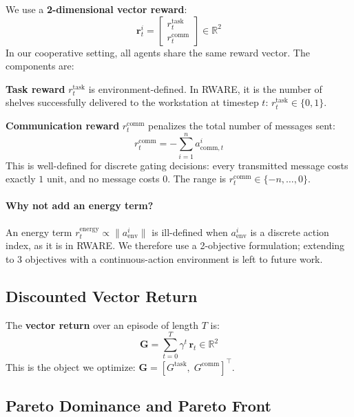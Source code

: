 \documentclass[runningheads]{llncs}
\newcommand{\R}{\mathbb{R}}
\newcommand{\bG}{\mathbf{G}}
\newcommand{\br}{\mathbf{r}}
\begin{document}
We use a \textbf{2-dimensional vector reward}:
\begin{equation}
  \br^i_t =
  \begin{bmatrix} r^{\text{task}}_t \\ r^{\text{comm}}_t \end{bmatrix}
  \in \R^2
  \label{eq:reward_vector}
\end{equation}
In our cooperative setting, all agents share the same reward vector.
The components are:

\textbf{Task reward} $r^{\text{task}}_t$ is environment-defined.
In RWARE, it is the number of shelves successfully delivered to the
workstation at timestep $t$: $r^{\text{task}}_t \in \{0, 1\}$.

\textbf{Communication reward} $r^{\text{comm}}_t$ penalizes the total
number of messages sent:
\begin{equation}
  r^{\text{comm}}_t = -\sum_{i=1}^{n} a^i_{\text{comm},t}
  \label{eq:comm_reward}
\end{equation}
This is well-defined for discrete gating decisions: every transmitted
message costs exactly $1$ unit, and no message costs $0$.
The range is $r^{\text{comm}}_t \in \{-n, \ldots, 0\}$.

\paragraph{Why not add an energy term?}
An energy term $r^{\text{energy}}_t \propto \|a^i_{\text{env}}\|$ is
ill-defined when $a^i_\text{env}$ is a discrete action index, as it is
in RWARE.
We therefore use a 2-objective formulation; extending to 3 objectives
with a continuous-action environment is left to future work.

\subsection{Discounted Vector Return}

The \textbf{vector return} over an episode of length $T$ is:
\begin{equation}
  \bG = \sum_{t=0}^{T} \gamma^t \, \br_t \in \R^2
  \label{eq:vector_return}
\end{equation}
This is the object we optimize: $\bG = [G^\text{task},\; G^\text{comm}]^\top$.

\subsection{Pareto Dominance and Pareto Front}
\end{document}
